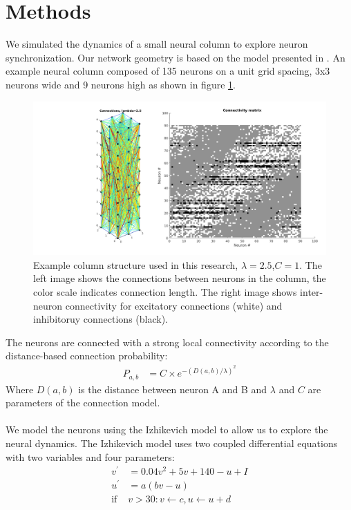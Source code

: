 \documentclass[a4paper,11pt]{article}
\begin{document}
\section{Methods}
We simulated the dynamics of a small neural column to explore neuron synchronization.
Our network geometry is based on the model presented in \cite{markram1998}.
An example neural column composed of 135 neurons on a unit grid spacing, 3x3 neurons wide and 9 neurons high as shown in figure \ref{fig:column_structure}.
\begin{figure}[!htb]
 \caption{Example column structure used in this research, $\lambda=2.5$,$C=1$. The left image shows the connections between neurons in the column, the color scale indicates connection length. The right image shows inter-neuron connectivity for excitatory connections (white) and inhibitoruy connections (black).}
 \label{fig:column_structure}
 \centering
   \includegraphics[width=\textwidth]{fig/lambda2}
\end{figure}
The neurons are connected with a strong local connectivity according to the distance-based connection probability:
\begin{align}\label{eq:connectivity}
 P_{a,b} &= C \times e^{-(D(a,b)/\lambda)^2}
\end{align}
Where $D(a,b)$ is the distance between neuron A and B and $\lambda$ and $C$ are parameters of the connection model.
\\ \\
We model the neurons using the Izhikevich model \cite{izhikevich2003} to allow us to explore the neural dynamics.
The Izhikevich model uses two coupled differential equations with two variables and four parameters:
\begin{align}
 v^\prime &= 0.04v^2+5v+140-u+I\\
 u^\prime &= a(bv-u)\\
 \text{if } &v>30: v\leftarrow c, u\leftarrow u+d
\end{align}
\end{document}
